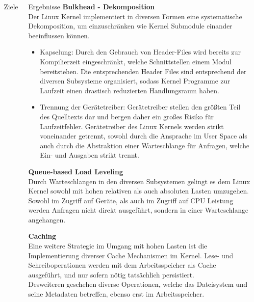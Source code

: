 \documentclass{beamer}
\begin{document}
\begin{frame}[t]
\begin{columns}[t]
\begin{column2}
\begin{block}{Ziele}
		\end{block}

	\end{column2}
	\begin{column2}
		\begin{block}{Ergebnisse} 
\small
\textbf{Bulkhead - Dekomposition} \\
Der Linux Kernel implementiert in diversen Formen eine systematische Dekomposition, um einzuschränken wie Kernel Submodule einander beeinflussen können. 
\begin{itemize}
	\item Kapselung: Durch den Gebrauch von Header-Files wird bereits zur Kompilierzeit eingeschränkt, welche Schnittstellen einem Modul bereitstehen. Die entsprechenden Header Files sind entsprechend der diversen Subsysteme organisiert, sodass Kernel Programme zur Laufzeit einen drastisch reduzierten Handlungsraum haben.
	\item Trennung der Gerätetreiber: Gerätetreiber stellen den größten Teil des Quelltexts dar und bergen daher ein großes Risiko für Laufzeitfehler. Gerätetreiber des Linux Kernels werden strikt voneinander getrennt, sowohl durch die Ansprache im User Space als auch durch die Abstraktion einer Warteschlange für Anfragen, welche Ein- und Ausgaben strikt trennt.
\end{itemize}

\textbf{Queue-based Load Leveling} \\
Durch Warteschlangen in den diversen Subsystemen gelingt es dem Linux Kernel sowohl mit hohen relativen als auch absoluten Lasten umzugehen. Sowohl im Zugriff auf Geräte, als auch im Zugriff auf CPU Leistung werden Anfragen nicht direkt ausgeführt, sondern in einer Warteschlange angehangen.

\textbf{Caching} \\
Eine weitere Strategie im Umgang mit hohen Lasten ist die Implementierung diverser Cache Mechanismen im Kernel. Lese- und Schreiboperationen werden mit dem Arbeitsspeicher als Cache ausgeführt, und nur sofern nötig tatsächlich persistiert. \\
Desweiteren geschehen diverse Operationen, welche das Dateisystem und seine Metadaten betreffen, ebenso erst im Arbeitsspeicher.


\end{block}
\end{column2}
\end{columns}
\end{frame}
\end{document}
